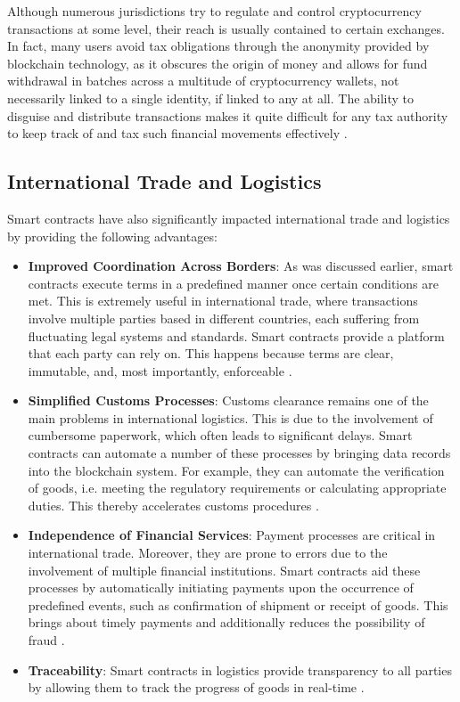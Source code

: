 Although numerous jurisdictions try to regulate and control cryptocurrency transactions at some level, their reach is usually contained to certain exchanges. In fact, many users avoid tax obligations through the anonymity provided by blockchain technology, as it obscures the origin of money and allows for fund withdrawal in batches across a multitude of cryptocurrency wallets, not necessarily linked to a single identity, if linked to any at all. The ability to disguise and distribute transactions makes it quite difficult for any tax authority to keep track of and tax such financial movements effectively \cite{CongEtAl2023}.

\subsection{International Trade and Logistics}

Smart contracts have also significantly impacted international trade and logistics by providing the following advantages: 

\begin{itemize}
    \item \textbf{Improved Coordination Across Borders}: As was discussed earlier, smart contracts execute terms in a predefined manner once certain conditions are met. This is extremely useful in international trade, where transactions involve multiple parties based in different countries, each suffering from fluctuating legal systems and standards. Smart contracts provide a platform that each party can rely on. This happens because terms are clear, immutable, and, most importantly, enforceable \cite{AlqarniEtAl2023, MagazzeniEtAl2017}.
    \item \textbf{Simplified Customs Processes}: Customs clearance remains one of the main problems in international logistics. This is due to the involvement of cumbersome paperwork, which often leads to significant delays. Smart contracts can automate a number of these processes by bringing data records into the blockchain system. For example, they can automate the verification of goods, i.e. meeting the regulatory requirements or calculating appropriate duties. This thereby accelerates customs procedures \cite{Law2017, AlqarniEtAl2023}.
    \item \textbf{Independence of Financial Services}: Payment processes are critical in international trade. Moreover, they are prone to errors due to the involvement of multiple financial institutions. Smart contracts aid these processes by automatically initiating payments upon the occurrence of predefined events, such as confirmation of shipment or receipt of goods. This brings about timely payments and additionally reduces the possibility of fraud \cite{AlqarniEtAl2023, MagazzeniEtAl2017}.
    \item \textbf{Traceability}: Smart contracts in logistics provide transparency to all parties by allowing them to track the progress of goods in real-time \cite{AlqarniEtAl2023}.
\end{itemize}

